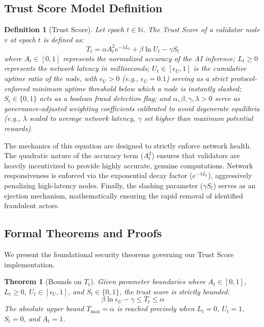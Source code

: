 \documentclass[journal]{IEEEtran}
\newtheorem{theorem}{Theorem}
\newtheorem{definition}{Definition}
\begin{document}
\subsection{Trust Score Model Definition}

\begin{definition}[Trust Score]
Let epoch $t \in \mathbb{N}$. The Trust Score of a validator node $v$ at epoch $t$ is defined as:
\begin{equation}
  T_t = \alpha A_t^2 e^{-\lambda L_t} + \beta \ln U_t - \gamma S_t
  \label{eq:trust}
\end{equation}
where $A_t \in [0,1]$ represents the normalized accuracy of the AI inference; $L_t \geq 0$ represents the network latency in milliseconds; $U_t \in [\epsilon_U,1]$ is the cumulative uptime ratio of the node, with $\epsilon_U > 0$ (e.g., $\epsilon_U = 0.1$) serving as a strict protocol-enforced minimum uptime threshold below which a node is instantly slashed; $S_t \in \{0,1\}$ acts as a boolean fraud detection flag; and $\alpha, \beta, \gamma, \lambda > 0$ serve as governance-adjusted weighting coefficients calibrated to avoid degenerate equilibria (e.g., $\lambda$ scaled to average network latency, $\gamma$ set higher than maximum potential rewards).
\end{definition}

The mechanics of this equation are designed to strictly enforce network health. The quadratic nature of the accuracy term ($A_t^2$) ensures that validators are heavily incentivized to provide highly accurate, genuine computations. Network responsiveness is enforced via the exponential decay factor ($e^{-\lambda L_t}$), aggressively penalizing high-latency nodes. Finally, the slashing parameter ($\gamma S_t$) serves as an ejection mechanism, mathematically ensuring the rapid removal of identified fraudulent actors.

\subsection{Formal Theorems and Proofs}

We present the foundational security theorems governing our Trust Score implementation.

\begin{theorem}[Bounds on $T_t$]
Given parameter boundaries where $A_t \in [0,1]$, $L_t \geq 0$, $U_t \in [\epsilon_U, 1]$, and $S_t \in \{0,1\}$, the trust score is strictly bounded:
\begin{equation}
  \beta \ln \epsilon_U - \gamma \leq T_t \leq \alpha
\end{equation}
The absolute upper bound $T_{\max} = \alpha$ is reached precisely when $L_t = 0$, $U_t = 1$, $S_t = 0$, and $A_t = 1$.
\end{theorem}
\end{document}
